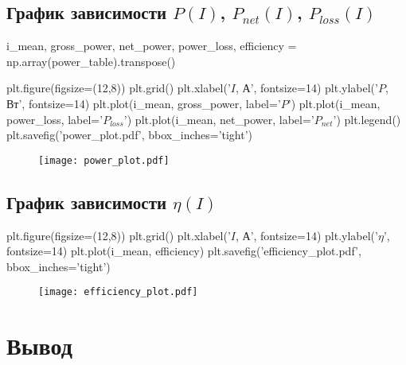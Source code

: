 \documentclass[12pt, a4paper]{article}
\begin{document}
\begin{table}[H]
\end{table} 

\subsection*{График зависимости $P(I)$, $P_{net}(I)$, $P_{loss}(I)$}

\begin{pycode}
i_mean, gross_power, net_power, power_loss, efficiency = np.array(power_table).transpose()

plt.figure(figsize=(12,8))
plt.grid()
plt.xlabel('$I$, А', fontsize=14)
plt.ylabel('$P$, Вт', fontsize=14)
plt.plot(i_mean, gross_power, label='$P$')
plt.plot(i_mean, power_loss, label='$P_{loss}$')
plt.plot(i_mean, net_power, label='$P_{net}$')
plt.legend()
plt.savefig('power_plot.pdf', bbox_inches='tight')
\end{pycode}

\begin{figure}[H]
\texttt{[image: power\_plot.pdf]}
\end{figure}

\subsection*{График зависимости $\eta(I)$}

\begin{pycode}
plt.figure(figsize=(12,8))
plt.grid()
plt.xlabel('$I$, А', fontsize=14)
plt.ylabel('$\eta$', fontsize=14)
plt.plot(i_mean, efficiency)
plt.savefig('efficiency_plot.pdf', bbox_inches='tight')
\end{pycode}

\begin{figure}[H]
\texttt{[image: efficiency\_plot.pdf]}
\end{figure}

\section*{Вывод}
\end{document}
